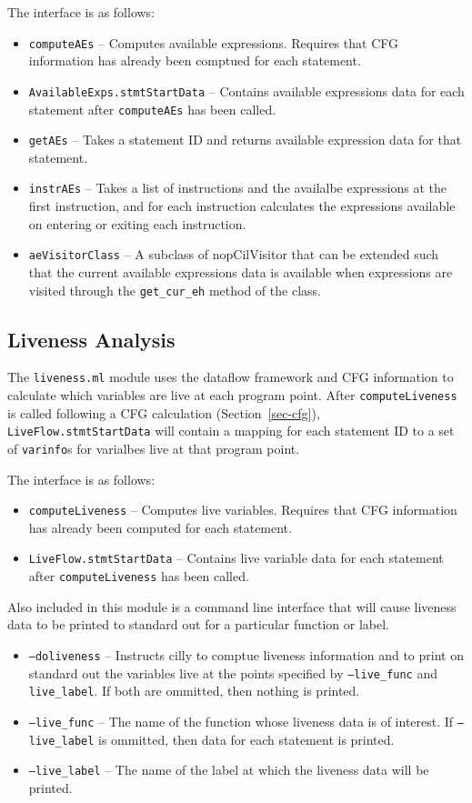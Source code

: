 \documentclass{article}
\def\secref#1{Section~\ref{sec-#1}}
\def\t#1{{\tt #1}}
\begin{document}
The interface is as follows:
\begin{itemize}
\item \t{computeAEs} -- Computes available expressions. Requires
that CFG information has already been comptued for each statement.
\item \t{AvailableExps.stmtStartData} -- Contains available
expressions data for each statement after \t{computeAEs} has been
called.
\item \t{getAEs} -- Takes a statement ID and returns
available expression data for that statement.
\item \t{instrAEs} -- Takes a list of instructions and
the availalbe expressions at the first instruction, and
for each instruction calculates the expressions available
on entering or exiting each instruction.
\item \t{aeVisitorClass} -- A subclass of nopCilVisitor that
can be extended such that the current available expressions
data is available when expressions are visited through the
\t{get\_cur\_eh} method of the class.
\end{itemize}

\subsection{Liveness Analysis}

The \t{liveness.ml} module uses the dataflow framework and
CFG information to calculate which variables are live at
each program point. After \t{computeLiveness} is called
following a CFG calculation (\secref{cfg}), \t{LiveFlow.stmtStartData} will
contain a mapping for each statement ID to a set of \t{varinfo}s
for varialbes live at that program point.

The interface is as follows:
\begin{itemize}
\item \t{computeLiveness} -- Computes live variables. Requires
that CFG information has already been computed for each statement.
\item \t{LiveFlow.stmtStartData} -- Contains live variable data
for each statement after \t{computeLiveness} has been called.
\end{itemize}

Also included in this module is a command line interface that
will cause liveness data to be printed to standard out for
a particular function or label.

\begin{itemize}
\item \t{--doliveness} -- Instructs cilly to comptue liveness
information and to print on standard out the variables live
at the points specified by \t{--live\_func} and \t{live\_label}.
If both are ommitted, then nothing is printed.
\item \t{--live\_func} -- The name of the function whose
liveness data is of interest. If \t{--live\_label} is ommitted,
then data for each statement is printed.
\item \t{--live\_label} -- The name of the label at which
the liveness data will be printed.
\end{itemize}
\end{document}
